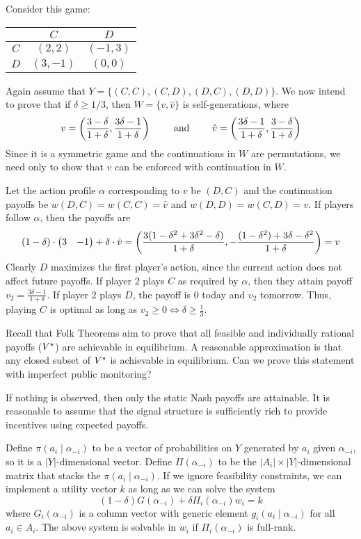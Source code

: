 \documentclass[10pt]{article}
\begin{document}
\begin{example}
	 Consider this game:
	\begin{center}
		\begin{tabular}{c|cc}
			& $C$ & $D$ \\\hline 
			$C$ & $(2,2)$ & $(-1,3)$ \\
			$D$ & $(3,-1)$ & $(0,0)$
		\end{tabular}
	\end{center}
	Again assume that $Y = \{(C,C),(C,D),(D,C),(D,D)\}$. We now intend to prove that if $\delta \ge 1/3$, then $W = \{v,\hat{v}\}$ is self-generations, where \[v = \left( \frac{3-\delta}{1+\delta}, \frac{3\delta - 1}{1+\delta} \right) \qquad \text{ and } \qquad \hat{v} = \left( \frac{3\delta - 1}{1+\delta}, \frac{3-\delta}{1+\delta}\right)\]Since it is a symmetric game and the continuations in $W$ are permutations, we need only to show that $v$ can be enforced with continuation in $W$. 
	
	Let the action profile $\alpha$ corresponding to $v$ be $(D,C)$ and the continuation payoffs be $w(D,C) = w(C,C) = \hat{v}$ and $w(D,D) = w(C,D) = v$. If players follow $\alpha$, then the payoffs are \[(1-\delta) \cdot \begin{pmatrix}3 & -1\end{pmatrix} + \delta\cdot  \hat{v} = \left( \frac{3(1-\delta^2+3\delta^2 -\delta)}{1+\delta}, -\frac{(1-\delta^2) + 3\delta - \delta^2}{1+\delta}\right) = v\]Clearly $D$ maximizes the first player's action, since the current action does not affect future payoffs. If player 2 plays $C$ as required by $\alpha$, then they attain payoff $v_2 = \frac{3\delta-1}{1+\delta}$. If player 2 plays $D$, the payoff is 0 today and $v_2$ tomorrow. Thus, playing $C$ is optimal as long as $v_2 \ge 0 \Longleftrightarrow \delta \ge \frac{1}{3}$.
\end{example}

\begin{remark}
	Recall that Folk Theorems aim to prove that all feasible and individually rational payoffs (\ie $V^\star$) are achievable in equilibrium. A reasonable approximation is that any closed subset of $V^\star$ is achievable in equilibrium. Can we prove this statement with imperfect public monitoring?
	
	If nothing is observed, then only the static Nash payoffs are attainable. It is reasonable to assume that the signal structure is sufficiently rich to provide incentives using expected payoffs.
\end{remark}	
	Define $\pi(a_i \mid \alpha_{-i})$ to be a vector of probabilities on $Y$ generated by $a_i$ given $\alpha_{-i}$, so it is a $|Y|$-dimensional vector. Define $\Pi(\alpha_{-i})$ to be the $|A_i| \times |Y|$-dimensional matrix that stacks the $\pi(a_i\mid \alpha_{-i})$. If we ignore feasibility constraints, we can implement a utility vector $k$ as long as we can solve the system\[(1-\delta)G(\alpha_{-i}) + \delta \Pi_i(\alpha_{-i})w_i = k\]where $G_i(\alpha_{-i})$ is a column vector with generic element $g_i(a_i \mid \alpha_{-i})$ for all $a_i\in A_i$. The above system is solvable in $w_i$ if $\Pi_i(\alpha_{-i})$ is full-rank.
\end{document}
